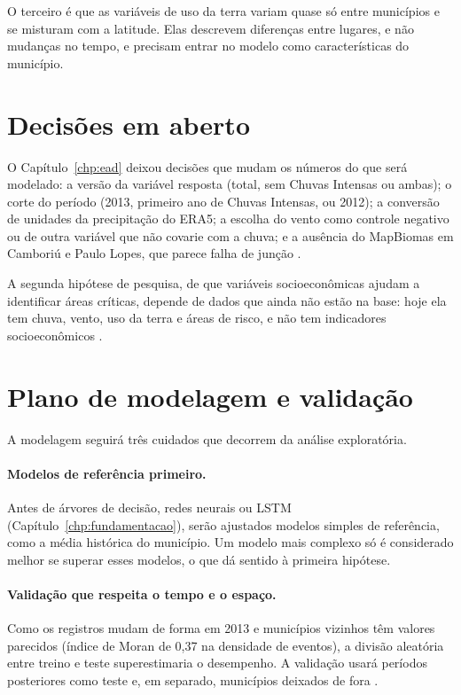 O terceiro é que as variáveis de uso da terra variam quase só entre municípios e se misturam com a latitude. Elas descrevem diferenças entre lugares, e não mudanças no tempo, e precisam entrar no modelo como características do município.

\section{Decisões em aberto}
\label{sec:res-decisoes}

O Capítulo~\ref{chp:ead} deixou decisões que mudam os números do que será modelado: a versão da variável resposta (total, sem Chuvas Intensas ou ambas); o corte do período (2013, primeiro ano de Chuvas Intensas, ou 2012); a conversão de unidades da precipitação do ERA5; a escolha do vento como controle negativo ou de outra variável que não covarie com a chuva; e a ausência do MapBiomas em Camboriú e Paulo Lopes, que parece falha de junção .

A segunda hipótese de pesquisa, de que variáveis socioeconômicas ajudam a identificar áreas críticas, depende de dados que ainda não estão na base: hoje ela tem chuva, vento, uso da terra e áreas de risco, e não tem indicadores socioeconômicos .

\section{Plano de modelagem e validação}
\label{sec:res-plano}

A modelagem seguirá três cuidados que decorrem da análise exploratória.

\paragraph*{Modelos de referência primeiro.} Antes de árvores de decisão, redes neurais ou LSTM (Capítulo~\ref{chp:fundamentacao}), serão ajustados modelos simples de referência, como a média histórica do município. Um modelo mais complexo só é considerado melhor se superar esses modelos, o que dá sentido à primeira hipótese.

\paragraph*{Validação que respeita o tempo e o espaço.} Como os registros mudam de forma em 2013 e municípios vizinhos têm valores parecidos (índice de Moran de 0,37 na densidade de eventos), a divisão aleatória entre treino e teste superestimaria o desempenho. A validação usará períodos posteriores como teste e, em separado, municípios deixados de fora .

